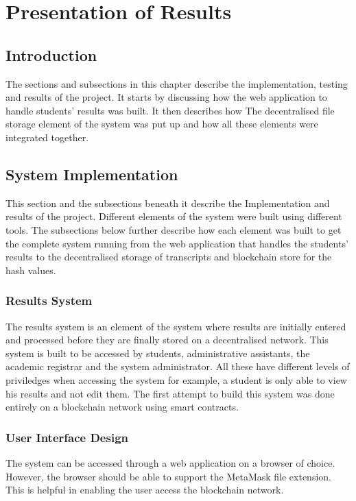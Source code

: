 \chapter{Presentation of Results}
\section{Introduction}
The sections and subsections in this chapter describe the implementation, testing and results of the project. It starts by discussing how the web application to handle students' results was built. It then describes how The decentralised file storage element of the system was put up and how all these elements were integrated together.

\section{System Implementation}
This section and the subsections beneath it describe the Implementation and results of the project. Different elements of the system were built using different tools. The subsections below further describe how each element was built to get the complete system running from the web application that handles the students' results to the decentralised storage of transcripts and blockchain store for the hash values.

\subsection{Results System}
The results system is an element of the system where results are initially entered and processed before they are finally stored on a decentralised network. This system is built to be accessed by students, administrative assistants, the academic registrar and the system administrator. All these have different levels of priviledges when accessing the system for example, a student is only able to view his results and not edit them. The first attempt to build this system was done entirely on a blockchain network using smart contracts. 

\subsection{User Interface Design}
The system can be accessed through a web application on a browser of choice. However, the browser should be able to support the MetaMask file extension. This is helpful in enabling the user access the blockchain network.

